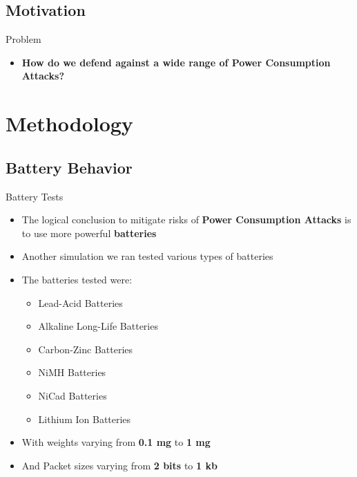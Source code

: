 \documentclass{beamer}
\begin{document}

\subsection{Motivation}

\begin{frame}{Problem}
\begin{itemize}

	\item \textbf{How do we defend against a wide range of Power Consumption Attacks?}
	
\end{itemize}
\end{frame}

\section{Methodology}

\subsection{Battery Behavior}

\begin{frame}{Battery Tests}
\begin{itemize}
	\item The logical conclusion to mitigate risks of \textbf{Power Consumption Attacks} is to use more powerful \textbf{batteries}
	\item Another simulation we ran tested various types of batteries
	\item The batteries tested were: 
	\begin{itemize}
	  \item Lead-Acid Batteries
	  \item Alkaline Long-Life Batteries
	  \item Carbon-Zinc Batteries
	  \item NiMH Batteries
	  \item NiCad Batteries
	  \item Lithium Ion Batteries
	\end{itemize}
	\item With weights varying from \textbf{0.1 mg} to \textbf{1 mg}
	\item And Packet sizes varying from \textbf{2 bits} to \textbf{1 kb}
\end{itemize}
\end{frame}
\end{document}
